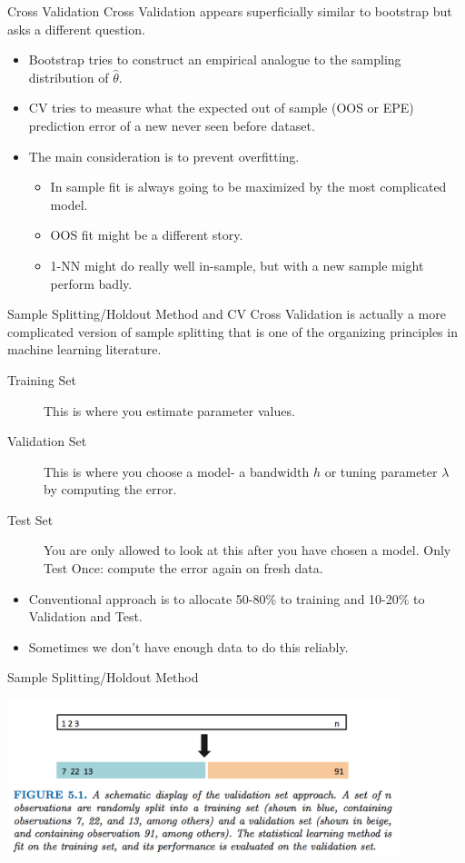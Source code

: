 \documentclass[11pt,handout,xcolor=pdftex,dvipsnames,table,mathserif,aspectratio=169]{beamer}
\begin{document}
\begin{frame}{Cross Validation}
Cross Validation appears superficially similar to bootstrap but asks a different question.
\begin{itemize}
\item Bootstrap tries to construct an empirical analogue to the sampling distribution of $\hat{\theta}$.
\item CV tries to measure what the expected out of sample (OOS or EPE) prediction error of a new never seen before dataset.
\item The main consideration is to prevent \alert{overfitting}.
\begin{itemize}
\item In sample fit is always going to be maximized by the most complicated model.
\item OOS fit might be a different story.
\item 1-NN might do really well in-sample, but with a new sample might perform badly.
\end{itemize}
\end{itemize}
\end{frame}

\begin{frame}{Sample Splitting/Holdout Method and CV}
Cross Validation is actually a more complicated version of \alert{sample splitting} that is one of the organizing principles in machine learning literature.

\begin{description}
\item[Training Set] This is where you estimate parameter values.
\item[Validation Set] This is where you choose a model- a bandwidth $h$ or tuning parameter $\lambda$ by computing the error.
\item[Test Set] You are only allowed to look at this after you have chosen a model. \alert{Only Test Once}: compute the error again on fresh data.
\end{description}
\begin{itemize}
\item Conventional approach is to allocate 50-80\% to training and 10-20\% to Validation and Test.
\item Sometimes we don't have enough data to do this reliably.
\end{itemize}
\end{frame}

\begin{frame}{Sample Splitting/Holdout Method}
\begin{center}
\includegraphics[width=4.5in]{./resources/split-sample}
\end{center}
\end{frame}
\end{document}
